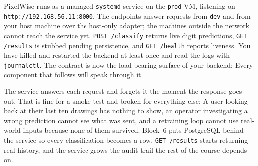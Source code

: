 PixelWise runs as a managed \texttt{systemd}
service on the \texttt{prod} VM, listening on
\texttt{http://192.168.56.11:8000}. The endpoints answer requests from
\texttt{dev} and from your host machine over the host-only adapter; the
machines outside the network cannot reach the service yet. \texttt{POST /classify} returns live digit predictions, \texttt{GET /results}
is stubbed pending persistence, and \texttt{GET /health} reports liveness.
You have killed and restarted the backend at least once and read the logs
with \texttt{journalctl}. The contract is now the load-bearing surface of your backend: Every
component that follows will speak through it.

 The service answers each
request and forgets it the moment the response goes out. That is fine
for a smoke test and broken for everything else: A user looking back
at their last ten drawings has nothing to show, an operator
investigating a wrong prediction cannot see what was sent, and a
retraining loop cannot use real-world inputs because none of them
survived. Block~6 puts PostgreSQL behind the service so every
classification becomes a row, \texttt{GET /results} starts returning
real history, and the service grows the audit trail the rest of the
course depends on.
